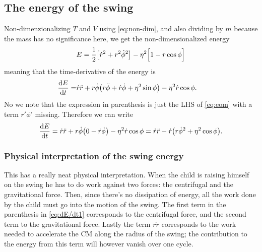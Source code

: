 \documentclass[10pt,letter, swedish, english,%
]{article}
\begin{document}
\subsection{The energy of the swing}
Non-dimenzionalizing $T$ and $V$ using \eqref{eq:non-dim}, %
and also dividing by $m$ because the mass has no significance here, we
get the non-dimensionalized energy  
\begin{equation}\label{eq:E}
E=\frac{1}{2}\qty[\dot{r}^2 + {r}^2\dot{\phi}^2] 
-\eta^2\Big[1-r\cos\phi\Big] 
\end{equation}
meaning that the time-derivative of the energy is
\begin{equation}
\begin{aligned}
\dv{E}{t}
=&\dot{r}\ddot{r}+r\dot\phi\qty(r\ddot\phi + \dot{r}\dot\phi + \eta^2\sin\phi) 
-\eta^2\dot{r}\cos\phi.
\end{aligned}
\end{equation}
No we note that the expression in parenthesis is just the LHS of
\eqref{eq:eom} with a term $r'\phi'$ missing. Therefore we can write
\begin{equation}\label{eq:dE/dt1}
\dv{E}{t}
=\dot{r}\ddot{r}+r\dot\phi\qty(0-\dot{r}\dot\phi)-\eta^2\dot{r}\cos\phi
=\dot{r}\ddot{r} - \dot{r}\qty(r\dot{\phi}^2 + \eta^2\cos\phi).
\end{equation}





\subsubsection{Physical interpretation of the swing energy}
\label{sec:phys_interp}
This has a really neat physical interpretation. When the child is
raising himself on the swing he has to do work against two forces:
the centrifugal and the gravitational force. Then, since there's no
dissipation of energy, all the work done by the child must go into the
motion of the swing. 
The first term in the parenthesis in \eqref{eq:dE/dt1} corresponds
to the centrifugal force, and the second term to the gravitational
force.
Lastly the term $\dot{r}\ddot{r}$ corresponds to the work needed to
accelerate the CM along the radius of the swing; the contribution to
the energy from this term will however vanish over one
cycle.\footnotemark{}   
\end{document}
